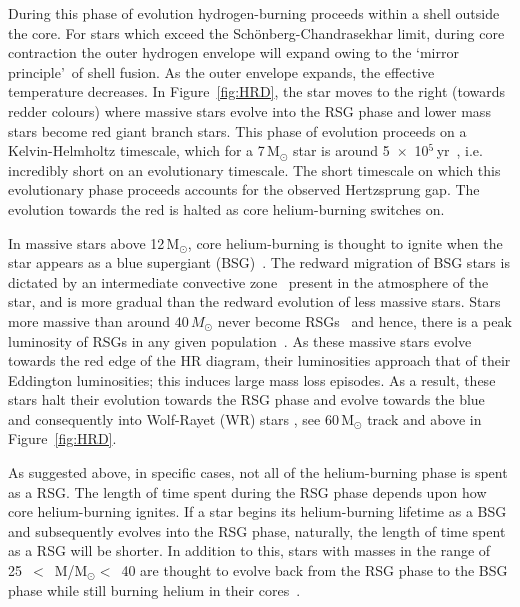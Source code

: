During this phase of evolution hydrogen-burning proceeds within a shell outside the core.
For stars which exceed the Sch\"onberg-Chandrasekhar limit, during core contraction the outer hydrogen envelope will expand owing to the \textquoteleft mirror principle\textquoteright ~of shell fusion.\footnotemark
{}
As the outer envelope expands, the effective temperature decreases.
In Figure~\ref{fig:HRD}, the star moves to the right (towards redder colours) where massive stars evolve into the RSG phase and lower mass stars become red giant branch stars.
This phase of evolution proceeds on a Kelvin-Helmholtz timescale, which for a 7\,M$_{\odot}$ star is around 5~$\times$~10$^{5}$\,yr~\citep{2012sse..book.....K}, i.e. incredibly short on an evolutionary timescale.
The short timescale on which this evolutionary phase proceeds accounts for the observed Hertzsprung gap.
The evolution towards the red is halted as core helium-burning switches on.

In massive stars above 12\,M$_{\odot}$, core helium-burning is thought to ignite when the star appears as a blue supergiant (BSG)~\citep{Meynet11,2012A&A...537A.146E,Langer12,Saio13}.
The redward migration of BSG stars is dictated by an intermediate convective zone~\citep{Meynet11} present in the atmosphere of the star, and is more gradual than the redward evolution of less massive stars.
Stars more massive than around 40\,$M_{\odot}$ never become RSGs~\citep{Massey03,Meynet11,2012A&A...537A.146E} and hence, there is a peak luminosity of RSGs in any given population~\citep{1979ApJ...232..409H}.
As these massive stars evolve towards the red edge of the HR diagram, their luminosities approach that of their Eddington luminosities; this induces large mass loss episodes.
As a result, these stars halt their evolution towards the RSG phase and evolve towards the blue and consequently into Wolf-Rayet (WR) stars
\citep{2007ARA&A..45..177C, Vink09}, see 60\,M$_{\odot}$ track and above in Figure~\ref{fig:HRD}.

As suggested above, in specific cases, not all of the helium-burning phase is spent as a RSG.
The length of time spent during the RSG phase depends upon how core helium-burning ignites.
If a star begins its helium-burning lifetime as a BSG and subsequently evolves into the RSG phase, naturally, the length of time spent as a RSG will be shorter.
In addition to this, stars with masses in the range of 25~$<$~M/M$_{\odot}<$~40 are thought to evolve back from the RSG phase to the BSG phase while still burning helium in their cores~\citep{2012A&A...537A.146E}.

